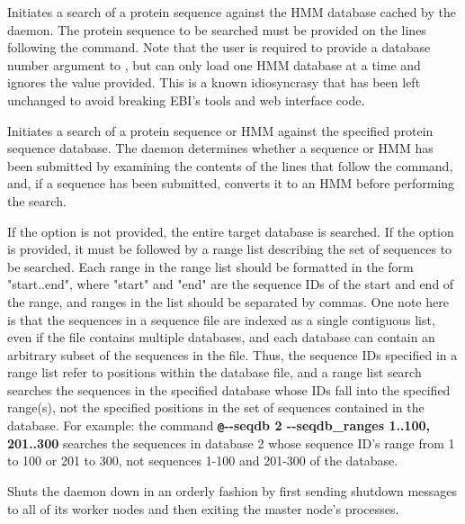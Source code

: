 \documentclass[notoc,justified]{tufte-book}    %
\begin{document}
\begin{sreitems}{}
  \item[\monob{@-{}-hmmdb <database \#>}]  Initiates a search of a protein sequence against the HMM database cached by the daemon.  The protein sequence to be searched must be provided on the lines following the  command.  Note that the user is required to provide a database number argument to , but  can only load one HMM database at a time and ignores the value provided.  This is a known idiosyncrasy that has been left unchanged to avoid breaking EBI's tools and web interface code.
  \item[\monob{@-{}-seqdb <database \#> [-{}-seqdb\_ranges <rangelist>]}] Initiates a search of a protein sequence or HMM against the specified protein sequence database.  The daemon determines whether a sequence or HMM has been submitted by examining the contents of the lines that follow the command, and, if a sequence has been submitted, converts it to an HMM before performing the search.

  If the  option is not provided, the entire target database is searched. If the  option is provided, it must be followed by a range list describing the set of sequences to be searched.  Each range in the range list should be formatted in the form "start..end", where "start" and "end" are the sequence IDs of the start and end of the range, and ranges in the list should be separated by commas. One note here is that the sequences in a sequence file are indexed as a single contiguous list, even if the file contains multiple databases, and each database can contain an arbitrary subset of the sequences in the file.  Thus, the sequence IDs specified in a range list refer to positions within the database file, and a range list search searches the sequences in the specified database whose IDs fall into the specified range(s), not the specified positions in the set of sequences contained in the database. For example: the command {\small\bfseries\texttt @-{}-seqdb 2 -{}-seqdb\_ranges 1..100, 201..300} searches the sequences in database 2 whose sequence ID's range from 1 to 100 or 201 to 300, not sequences 1-100 and 201-300 of the database.
  \item[\monob{!shutdown}] Shuts the daemon down in an orderly fashion by first sending shutdown messages to all of its worker nodes and then exiting the master node's processes.
\end{sreitems}
\end{document}
